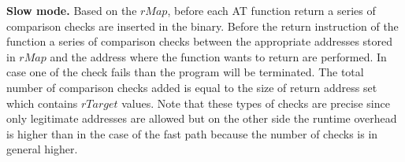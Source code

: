 \textbf{Slow mode.} Based on the $rMap$, before each AT function return a series of comparison checks are inserted in the binary. 
Before the return instruction of the function a series of comparison checks between the appropriate 
addresses stored in $rMap$ and the address where the function wants to return are performed. In case one of the check fails than the 
program will be terminated. The total number of comparison checks added is equal to the size of return address set which contains $rTarget$ values. 
Note that these types of checks are precise since only legitimate addresses are allowed but on the other side the runtime overhead is higher than in the 
case of the fast path because the number of checks is in general higher.
 



